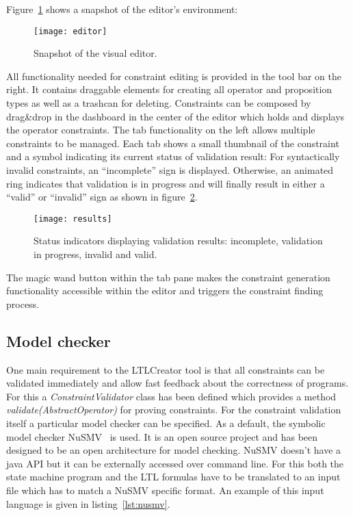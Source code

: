Figure~\ref{fig:editor} shows a snapshot of the editor's environment:
\begin{figure}[htbp]
  \centering
  \texttt{[image: editor]} 
  \caption{Snapshot of the visual editor.}
  \label{fig:editor}
\end{figure}
All functionality needed for constraint editing is provided in the tool bar on the right. It contains draggable elements for creating all operator and proposition types as well as a trashcan for deleting. Constraints can be composed by drag\&drop in the dashboard in the center of the editor which holds and displays the operator constraints. The tab functionality on the left allows multiple constraints to be managed. Each tab shows a small thumbnail of the constraint and a symbol indicating its current status of validation result: For syntactically invalid constraints, an ``incomplete'' sign is displayed. Otherwise, an animated ring indicates that validation is in pro\-gress and will finally result in either a ``valid'' or ``invalid'' sign as shown in figure~\ref{fig:results}.
\begin{figure}[htbp]
  \centering
  \texttt{[image: results]}
  \caption{Status indicators displaying validation results: incomplete, validation in pro\-gress, invalid and valid.}
  \label{fig:results}
\end{figure}	
The magic wand button within the tab pane makes the constraint generation functionality accessible within the editor and triggers the constraint finding process.










\subsection{Model checker}

One main requirement to the LTLCreator tool is that all constraints can be validated immediately and allow fast feedback about the correctness of programs. For this a \emph{ConstraintValidator} class has been defined which provides a method \emph{validate(AbstractOperator)} for proving constraints.
For the constraint validation itself a particular model checker can be specified. As a default, the symbolic model checker NuSMV~\cite{springerlink:10.1007/s100090050046,NuSMV2} is used. It is an open source project and has been designed to be an open architecture for model checking. NuSMV doesn't have a java API but it can be externally accessed over command line. For this both the state machine program and the LTL formulas have to be translated to an input file which has to match a NuSMV specific format. An example of this input language is given in listing~\ref{lst:nusmv}.

